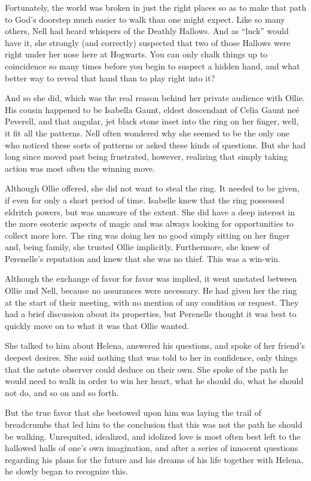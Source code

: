 Fortunately, the world was broken in just the right places so as to make that path to God’s doorstep much easier to walk than one might expect. Like so many others, Nell had heard whispers of the Deathly Hallows. And as “luck” would have it, she strongly (and correctly) suspected that two of those Hallows were right under her nose here at Hogwarts. You can only chalk things up to coincidence so many times before you begin to suspect a hidden hand, and what better way to reveal that hand than to play right into it?

And so she did, which was the real reason behind her private audience with Ollie. His cousin happened to be Isabella Gaunt, eldest descendant of Celia Gaunt neé Peverell, and that angular, jet black stone inset into the ring on her finger, well, it fit all the patterns. Nell often wondered why she seemed to be the only one who noticed these sorts of patterns or asked these kinds of questions. But she had long since moved past being frustrated, however, realizing that simply taking action was most often the winning move.

Although Ollie offered, she did not want to steal the ring. It needed to be given, if even for only a short period of time. Isabelle knew that the ring possessed eldritch powers, but was unaware of the extent. She did have a deep interest in the more esoteric aspects of magic and was always looking for opportunities to collect more lore. The ring was doing her no good simply sitting on her finger and, being family, she trusted Ollie implicitly. Furthermore, she knew of Perenelle’s reputation and knew that she was no thief. This was a win-win.

Although the exchange of favor for favor was implied, it went unstated between Ollie and Nell, because no assurances were necessary. He had given her the ring at the start of their meeting, with no mention of any condition or request. They had a brief discussion about its properties, but Perenelle thought it was best to quickly move on to what it was that Ollie wanted.

She talked to him about Helena, answered his questions, and spoke of her friend’s deepest desires. She said nothing that was told to her in confidence, only things that the astute observer could deduce on their own. She spoke of the path he would need to walk in order to win her heart, what he should do, what he should not do, and so on and so forth.

But the true favor that she bestowed upon him was laying the trail of breadcrumbs that led him to the conclusion that this was not the path he should be walking. Unrequited, idealized, and idolized love is most often best left to the hallowed halls of one’s own imagination, and after a series of innocent questions regarding his plans for the future and his dreams of his life together with Helena, he slowly began to recognize this.


